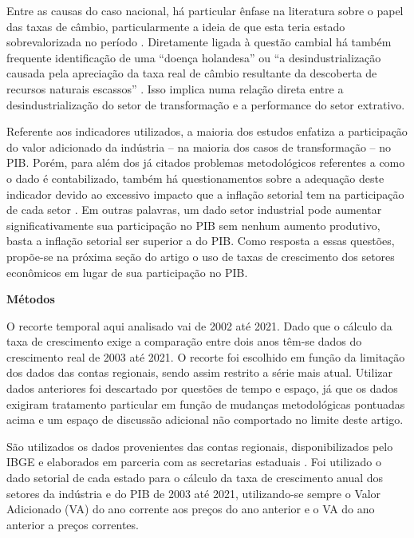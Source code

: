 {{Entre as causas do caso nacional, há particular ênfase na literatura
sobre o papel das taxas de câmbio, particularmente a ideia de que esta
teria estado sobrevalorizada no período
\citep{marconi_taxa_2012,oreiro_desindustrializacao_2010}. Diretamente ligada à questão cambial há
também frequente identificação de uma ``doença holandesa''
\citep{cunha_desindustrializacao_2013}ou ``a desindustrialização causada pela apreciação da
taxa real de câmbio resultante da descoberta de recursos naturais
escassos'' \citep[p.~222]{oreiro_desindustrializacao_2010}. Isso implica numa relação direta entre a
desindustrialização do setor de transformação e a performance do setor
extrativo.

Referente aos indicadores utilizados, a maioria dos estudos enfatiza a
participação do valor adicionado da indústria -- na maioria dos casos de
transformação -- no PIB. Porém, para além dos já citados problemas
metodológicos referentes a como o dado é contabilizado, também há
questionamentos sobre a adequação deste indicador devido ao excessivo
impacto que a inflação setorial tem na participação de cada setor
\citep{torres_uma_2015}. Em outras palavras, um dado setor industrial pode aumentar
significativamente sua participação no PIB sem nenhum aumento produtivo,
basta a inflação setorial ser superior a do PIB. Como resposta a essas
questões, propõe-se na próxima seção do artigo o uso de taxas de
crescimento dos setores econômicos em lugar de sua participação no PIB.

\textbf{Métodos}

O recorte temporal aqui analisado vai de 2002 até 2021. Dado que o
cálculo da taxa de crescimento exige a comparação entre dois anos têm-se
dados do crescimento real de 2003 até 2021. O recorte foi escolhido em
função da limitação dos dados das contas regionais, sendo assim restrito
a série mais atual. Utilizar dados anteriores foi descartado por
questões de tempo e espaço, já que os dados exigiram tratamento
particular em função de mudanças metodológicas pontuadas acima e um
espaço de discussão adicional não comportado no limite deste artigo.

São utilizados os dados provenientes das contas regionais,
disponibilizados pelo IBGE e elaborados em parceria com as secretarias
estaduais \citep{ibge_contas_nodate}. Foi utilizado o dado setorial de cada estado para o
cálculo da taxa de crescimento anual dos setores da indústria e do PIB
de 2003 até 2021, utilizando-se sempre o Valor Adicionado (VA) do ano
corrente aos preços do ano anterior e o VA do ano anterior a preços
correntes.

}}
